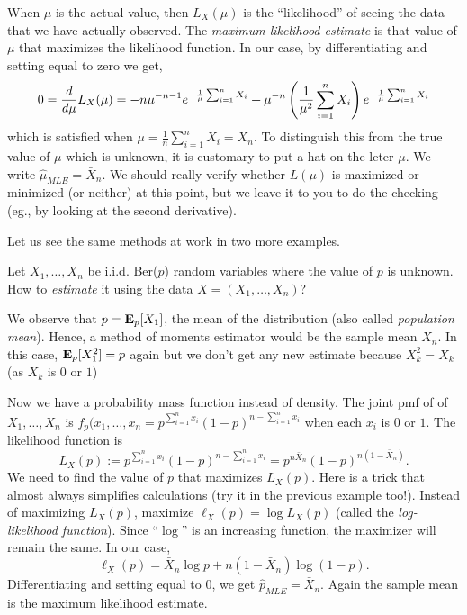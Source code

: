 \documentclass[preprint,  11pt]{amsart}
\begin{document}
\begin{example}
When $\mu$ is the actual value, then $L_{X}(\mu)$ is the ``likelihood'' of seeing the data that we have actually observed. The {\em maximum likelihood estimate} is that value of $\mu$ that maximizes the likelihood function. In our case, by differentiating and setting equal to zero we get,
$$
0 =\frac{d}{d\mu}L_{X}(\mu) = -n\mu^{-n-1}e^{-\frac{1}{\mu}\sum_{i=1}^{n}X_{i}}+\mu^{-n}\left(\frac{1}{\mu^{2}}\sum_{i=1}^{n}X_{i}\right)e^{-\frac{1}{\mu}\sum_{i=1}^{n}X_{i}}
$$
which is satisfied when $\mu=\frac{1}{n}\sum_{i=1}^{n}X_{i}=\bar{X}_{n}$. To distinguish this from the true value of $\mu$ which is unknown, it is customary to put a hat on the leter $\mu$. We write $\hat{\mu}_{MLE}=\bar{X}_{n}$. We should really verify whether $L(\mu)$ is maximized or minimized (or neither) at this point, but we leave it to you to do the checking (eg., by looking at the second derivative).
\end{example}

Let us see the same methods at work in two more examples.
\begin{example} Let $X_{1},\ldots ,X_{n}$ be i.i.d. Ber($p$) random variables where the value of $p$ is unknown. How to  {\em estimate} it using the data $X=(X_{1},\ldots ,X_{n})$?

 We observe that $p=\mathbf{E}_{p}[X_{1}]$, the mean of the distribution (also called {\em population mean}). Hence, a method of moments estimator would be   the sample mean $\bar{X}_{n}$. In this case, $\mathbf{E}_{p}[X_{1}^{2}]=p$ again but we don't get any new estimate because $X_{k}^{2}=X_{k}$ (as $X_{k}$ is $0$ or $1$)

 Now we have a probability mass function instead of density. The joint pmf of of $X_{1},\ldots ,X_{n}$ is $f_{p}(x_{1},\ldots ,x_{n}=p^{\sum_{i=1}^{n}x_{i}}(1-p)^{n-\sum_{i=1}^{n}x_{i}}$ when each $x_{i}$ is $0$ or $1$. The likelihood function is
$$
L_{X}(p) := p^{\sum_{i=1}^{n}x_{i}}(1-p)^{n-\sum_{i=1}^{n}x_{i}} = p^{n\bar{X}_{n}}(1-p)^{n(1-\bar{X}_{n})}.
$$
We need to find the value of $p$ that maximizes $L_{X}(p)$. Here is a trick that almost always simplifies calculations (try it in the previous example too!). Instead of maximizing $L_{X}(p)$, maximize $\ell_{X}(p)=\log L_{X}(p)$ (called the {\em log-likelihood function}). Since ``$\log$'' is an increasing function, the maximizer will remain the same. In our case,
$$
\ell_{X}(p)=\bar{X}_{n}\log p + n(1-\bar{X}_{n})\log (1-p).
$$
 Differentiating and setting equal to $0$, we get $\hat{p}_{MLE}=\bar{X}_{n}$. Again the sample mean is the maximum likelihood estimate.
\end{example}
\end{document}
